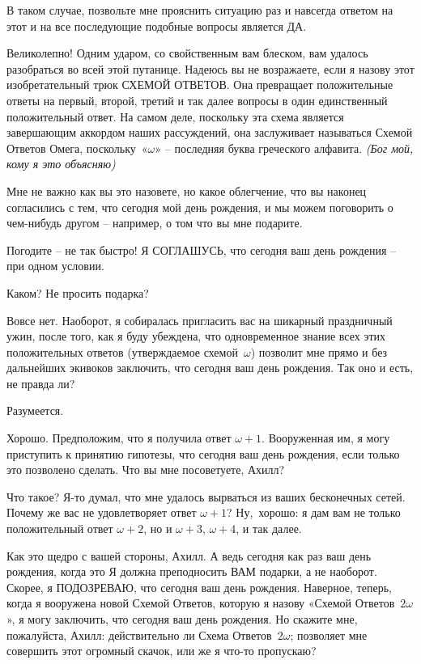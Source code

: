 \documentclass[../main.tex]{subfiles}
\begin{document}
\begin{dialogue}
 В таком случае, позвольте мне прояснить ситуацию раз и навсегда ответом на этот и на все последующие подобные вопросы является ДА.

 Великолепно! Одним ударом, со свойственным вам блеском, вам удалось разобраться во всей этой путанице. Надеюсь вы не возражаете, если я назову этот изобретательный трюк СХЕМОЙ ОТВЕТОВ. Она превращает положительные ответы на первый, второй, третий и так далее вопросы в один единственный положительный ответ. На самом деле, поскольку эта схема является завершающим аккордом наших рассуждений, она заслуживает называться Схемой Ответов Омега, поскольку~«$\omega$» \--- последняя буква греческого алфавита. \emph{(Бог мой, кому я это объясняю\edots)}

 Мне не важно как вы это назовете, но какое облегчение, что вы наконец согласились с тем, что сегодня мой день рождения, и мы можем поговорить о чем-нибудь другом \--- например, о том что вы мне подарите.

 Погодите \--- не так быстро! Я СОГЛАШУСЬ, что сегодня ваш день рождения \--- при одном условии.

 Каком? Не просить подарка?

 Вовсе нет. Наоборот, я собиралась пригласить вас на шикарный праздничный ужин, после того, как я буду убеждена, что одновременное знание всех этих положительных ответов (утверждаемое схемой~$\omega$) позволит мне прямо и без дальнейших экивоков заключить, что сегодня ваш день рождения. Так оно и есть, не правда ли?

 Разумеется.

 Хорошо. Предположим, что я получила ответ $\omega + 1$. Вооруженная им, я могу приступить к принятию гипотезы, что сегодня ваш день рождения, если только это позволено сделать. Что вы мне посоветуете, Ахилл?

 Что такое? Я-то думал, что мне удалось вырваться из ваших бесконечных сетей. Почему же вас не удовлетворяет ответ $\omega + 1$? Ну,~хорошо: я дам вам не только положительный ответ $\omega + 2$, но и $\omega + 3$, $\omega + 4$, и так далее.

 Как это щедро с вашей стороны, Ахилл. А ведь сегодня как раз ваш день рождения, когда это Я должна преподносить ВАМ подарки, а не наоборот. Скорее, я ПОДОЗРЕВАЮ, что сегодня ваш день рождения. Наверное, теперь, когда я вооружена новой Схемой Ответов, которую я назову «Схемой Ответов~$2\omega$», я могу заключить, что сегодня ваш день рождения. Но скажите мне, пожалуйста, Ахилл: действительно ли Схема Ответов~$2\omega$; позволяет мне совершить этот огромный скачок, или же я что-то пропускаю?


\end{dialogue}
\end{document}

